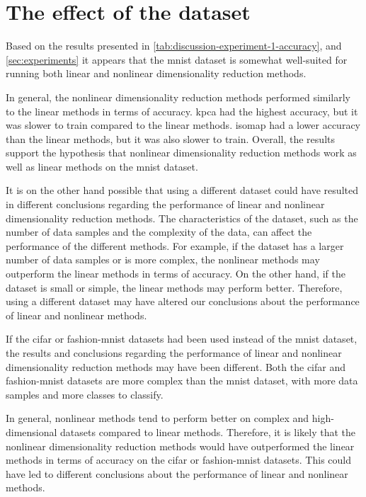 \section{The effect of the dataset}\label{sec:discussion-of-data}
Based on the results presented in \autoref{tab:discussion-experiment-1-accuracy}, and \autoref{sec:experiments} it appears that the \gls{mnist} dataset is somewhat well-suited for running both linear and nonlinear dimensionality reduction methods.

In general, the nonlinear dimensionality reduction methods performed similarly to the linear methods in terms of accuracy. \gls{kpca} had the highest accuracy, but it was slower to train compared to the linear methods. \gls{isomap} had a lower accuracy than the linear methods, but it was also slower to train. Overall, the results support the hypothesis that nonlinear dimensionality reduction methods work as well as linear methods on the \gls{mnist} dataset.

It is on the other hand possible that using a different dataset could have resulted in different conclusions regarding the performance of linear and nonlinear dimensionality reduction methods. The characteristics of the dataset, such as the number of data samples and the complexity of the data, can affect the performance of the different methods. For example, if the dataset has a larger number of data samples or is more complex, the nonlinear methods may outperform the linear methods in terms of accuracy. On the other hand, if the dataset is small or simple, the linear methods may perform better. Therefore, using a different dataset may have altered our conclusions about the performance of linear and nonlinear methods.

If the \gls{cifar} or \gls{fashion-mnist} datasets had been used instead of the \gls{mnist} dataset, the results and conclusions regarding the performance of linear and nonlinear dimensionality reduction methods may have been different. Both the \gls{cifar} and \gls{fashion-mnist} datasets are more complex than the \gls{mnist} dataset, with more data samples and more classes to classify.

In general, nonlinear methods tend to perform better on complex and high-dimensional datasets compared to linear methods. Therefore, it is likely that the nonlinear dimensionality reduction methods would have outperformed the linear methods in terms of accuracy on the \gls{cifar} or \gls{fashion-mnist} datasets. This could have led to different conclusions about the performance of linear and nonlinear methods.


